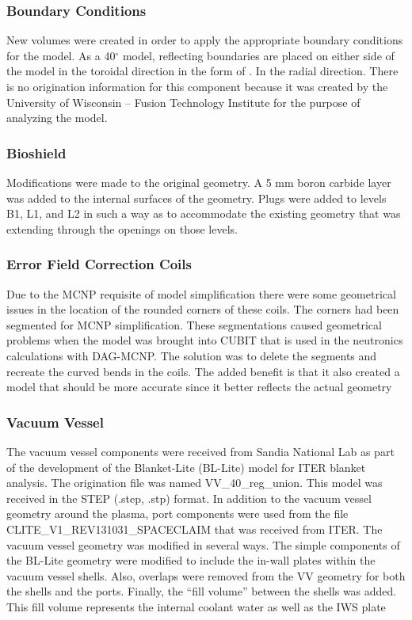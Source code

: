\documentclass[12pt]{article}
\begin{document}
\subsubsection*{Boundary Conditions}
New volumes were created in order to apply the appropriate boundary conditions
for the model.  As a 40${^\circ}$ model, reflecting boundaries are placed on
either side of the model in the toroidal direction in the form of .  In the radial direction. 
There is no origination information for this component because it was 
created by the University of Wisconsin – Fusion Technology Institute for the
purpose of analyzing the model.
\subsubsection*{Bioshield}
Modifications were made to the original geometry. A 5 mm boron carbide layer was
 added to the internal surfaces of the geometry. Plugs were added to levels B1, 
L1, and L2 in such a way as to accommodate the existing geometry that was 
extending through the openings on those levels.
\subsubsection*{Error Field Correction Coils}
Due to the MCNP requisite of model simplification there were some geometrical 
issues in the location of the rounded corners of these coils. The corners had 
been segmented for MCNP simplification. These segmentations caused geometrical 
problems when the model was brought into CUBIT that is used in the neutronics 
calculations with DAG-MCNP. The solution was to delete the segments and 
recreate the curved bends in the coils. The added benefit is that it also 
created a model that should be more accurate since it better reflects the 
actual geometry
\subsubsection*{Vacuum Vessel}
The vacuum vessel components were received from Sandia National Lab as part of 
the development of the Blanket-Lite (BL-Lite) model for ITER blanket analysis.
The origination file was named VV\_40\_reg\_union. This model was received in the 
STEP (.step, .stp) format. In addition to the vacuum vessel geometry around the
plasma, port components were used from the file CLITE\_V1\_REV131031\_SPACECLAIM 
that was received from ITER. The vacuum vessel geometry was modified in several 
ways. The simple components of the BL-Lite geometry were modified to include 
the in-wall plates within the vacuum vessel shells. Also, overlaps were removed 
from the VV geometry for both the shells and the ports. Finally, the “fill
volume” between the shells was added. This fill volume represents the internal 
coolant water as well as the IWS plate
\end{document}
